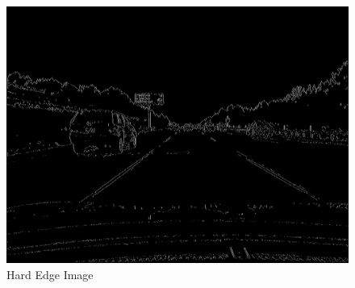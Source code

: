 \documentclass[12pt,a4paper]{report}
\begin{document}
\begin{figure}[!htb]
  \centering
  \includegraphics[height=0.4\paperheight]{output/img2_q2_HYS.png}
  \caption{Hard Edge Image}
\end{figure}
\clearpage
\end{document}
